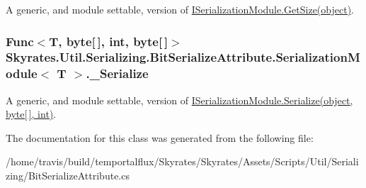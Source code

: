 A generic, and module settable, version of \hyperlink{interface_skyrates_1_1_util_1_1_serializing_1_1_bit_serialize_attribute_1_1_i_serialization_module_aa1b15bcdfbdbf7422513276ffcf3d272}{I\-Serialization\-Module.\-Get\-Size(object)}. 

\hypertarget{class_skyrates_1_1_util_1_1_serializing_1_1_bit_serialize_attribute_1_1_serialization_module_3_01_t_01_4_acc07c7d7f8bb9725a4069d3297a25b43}{
\subsubsection[{\-\_\-\-Serialize}]{\setlength{\rightskip}{0pt plus 5cm}Func$<$T, byte\mbox{[}$\,$\mbox{]}, int, byte\mbox{[}$\,$\mbox{]}$>$ Skyrates.\-Util.\-Serializing.\-Bit\-Serialize\-Attribute.\-Serialization\-Module$<$ T $>$.\-\_\-\-Serialize}}\label{class_skyrates_1_1_util_1_1_serializing_1_1_bit_serialize_attribute_1_1_serialization_module_3_01_t_01_4_acc07c7d7f8bb9725a4069d3297a25b43}


A generic, and module settable, version of \hyperlink{interface_skyrates_1_1_util_1_1_serializing_1_1_bit_serialize_attribute_1_1_i_serialization_module_a193efb5678e7782fb5de5c2f7c9116da}{I\-Serialization\-Module.\-Serialize(object, byte\mbox{[}$\,$\mbox{]}, int)}. 



The documentation for this class was generated from the following file\-:\begin{DoxyCompactItemize}
\item 
/home/travis/build/temportalflux/\-Skyrates/\-Skyrates/\-Assets/\-Scripts/\-Util/\-Serializing/Bit\-Serialize\-Attribute.\-cs\end{DoxyCompactItemize}
